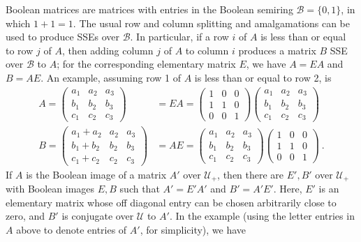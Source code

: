 \documentclass{amsart}
\theoremstyle{definition}
\theoremstyle{remark}
\numberwithin{equation}{section}
\begin{document}
{{Boolean matrices are matrices with entries in the 
Boolean semiring $\mathcal B= \{ 0,1 \}$, in which $1+1=1$.  
The usual row and column splitting and amalgamations can be 
used to produce SSEs over $\mathcal B$. In 
particular, if a row $i$ of $A$ is less than or equal 
to row $j$ of $A$, then adding column $j$ of $A$ to column $i$ 
produces a matrix $B$ SSE over $\mathcal B$ to $A$; for the 
corresponding  elementary matrix $E$, we have  
$A=EA$ and $B=AE$.
An example,  
assuming row 1 of $A$ is less than or equal to row 2, is 
\begin{align*}
A= \begin{pmatrix} 
a_1 & a_2 & a_3 \\
b_1 & b_2 & b_3 \\
c_1 & c_2 & c_3 
\end{pmatrix} 
& = EA = 
\begin{pmatrix} 
1 & 0 & 0 \\ 
1 & 1 &0 \\ 0 & 0 & 1 
\end{pmatrix} 
\begin{pmatrix} 
a_1 & a_2 & a_3 \\
b_1 & b_2 & b_3 \\
c_1 & c_2 & c_3 
\end{pmatrix} \\ 
B =
\begin{pmatrix} 
a_1+a_2  &a_2  & a_3 \\
b_1+b_2  &b_2  & b_3 \\
c_1+c_2  &c_2  & c_3 
\end{pmatrix} 
&= AE = 
\begin{pmatrix} 
a_1 & a_2 & a_3 \\
b_1 & b_2 & b_3 \\
c_1 & c_2 & c_3 
\end{pmatrix} 
\begin{pmatrix} 
1 & 0 & 0 \\ 
1 & 1 &0 \\ 0 & 0 & 1 
\end{pmatrix} \ . 
\end{align*}
If $A$ is the Boolean image of a matrix $A'$ over $\mathcal U_+$, 
then there are $E',B'$ over   $\mathcal U_+$ 
with Boolean images  $E,B$ such that  
$A'=E'A'$ and $B'=A'E'$. Here, $E'$ is an elementary matrix 
whose off diagonal entry  can be chosen arbitrarily close to 
zero, and $B'$ is conjugate 
over $\mathcal U$ to $A'$. In 
the example (using the letter entries in $A$ above to denote 
entries of $A'$, for simplicity), we have 
}}
\end{document}
